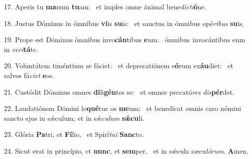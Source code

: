 17. Aperis tu \textbf{ma}num \textbf{tu}am: \ast\  et imples omne ánimal bene\textit{dic}\textit{ti}\textbf{ó}ne.\

18. Justus Dóminus in ómnibus \textbf{vi}is \textbf{su}is: \ast\  et sanctus in ómnibus opé\textit{ri}\textit{bus} \textbf{su}is.\

19. Prope est Dóminus ómnibus invo\textbf{cán}tibus \textbf{e}um: \ast\  ómnibus invocántibus eum in \textit{ve}\textit{ri}\textbf{tá}te.\

20. Voluntátem timéntium se fáciet: \dag\  et deprecatiónem e\textbf{ó}rum ex\textbf{áu}diet: \ast\  et salvos fá\textit{ci}\textit{et} \textbf{e}os.\

21. Custódit Dóminus omnes \textbf{di}li\textbf{gén}tes se: \ast\  et omnes peccató\textit{res} \textit{dis}\textbf{pér}det.\

22. Laudatiónem Dómini lo\textbf{qué}tur os \textbf{me}um: \ast\  et benedícat omnis caro nómini sancto ejus in sǽculum, et in sǽ\textit{cu}\textit{lum} \textbf{sǽ}\textbf{cu}li.\

23. Glória \textbf{Pa}tri, et \textbf{Fí}lio, \ast\  et Spirí\textit{tu}\textit{i} \textbf{Sanc}to.\

24. Sicut erat in princípio, et \textbf{nunc}, et \textbf{sem}per, \ast\  et in sǽcula sæcu\textit{ló}\textit{rum}. \textbf{A}men.\

